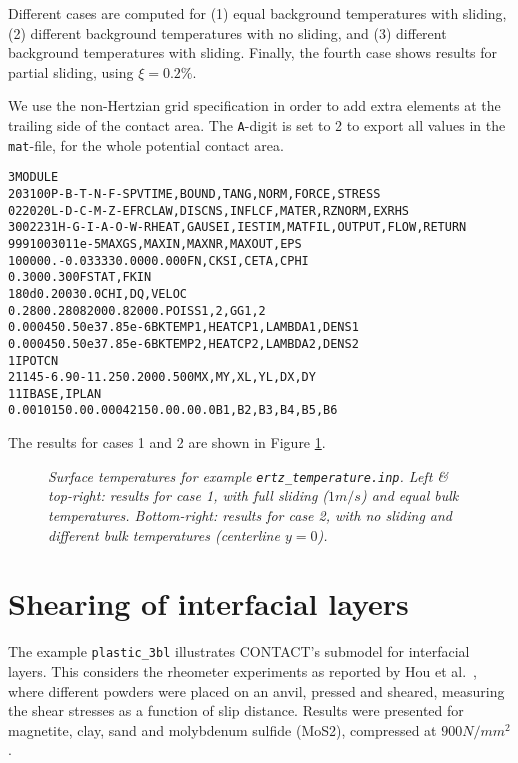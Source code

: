 \documentclass[12pt]{report}
\begin{document}
Different cases are computed for (1) equal background temperatures with
sliding, (2) different background temperatures with no sliding, and (3)
different background temperatures with sliding. Finally, the fourth case
shows results for partial sliding, using $\xi=0.2\%$.

We use the non-Hertzian grid specification in order to add extra elements
at the trailing side of the contact area. The {\tt A}-digit is set to 2 to
export all values in the {\tt mat}-file, for the whole potential contact
area. 
\begin{alltt}\small
 3  MODULE
  203100    P-B-T-N-F-S        PVTIME, BOUND , TANG  , NORM , FORCE, STRESS
  022020    L-D-C-M-Z-E        FRCLAW, DISCNS, INFLCF, MATER, RZNORM, EXRHS
 3002231  H-G-I-A-O-W-R  HEAT, GAUSEI, IESTIM, MATFIL, OUTPUT, FLOW, RETURN
   999   100    30      1     1e-5     MAXGS , MAXIN , MAXNR , MAXOUT, EPS
  100000.  -0.03333  0.000    0.000          FN, CKSI, CETA, CPHI
   0.300    0.300                            FSTAT, FKIN
   180d     0.200    30.0                    CHI, DQ, VELOC
   0.280    0.280    82000.   82000.         POISS 1,2,  GG 1,2
   0.000    450.     50e3     7.85e-6        BKTEMP1, HEATCP1, LAMBDA1,DENS1
   0.000    450.     50e3     7.85e-6        BKTEMP2, HEATCP2, LAMBDA2,DENS2
    1                                        IPOTCN
   211  45  -6.90  -11.25   0.200   0.500    MX,MY, XL,YL, DX,DY
    1    1                                   IBASE, IPLAN
  0.001015  0.0  0.0004215  0.0  0.0  0.0    B1,B2,B3,B4,B5,B6
\end{alltt}
The results for cases 1 and 2 are shown in Figure \ref{fig:temperature}.

\begin{figure}[bt]
\centering
{}
\caption{\em Surface temperatures for example {\tt ertz\_temperature.inp}.
Left \& top-right: results for case 1, with full sliding ($1\unit{m/s}$) and
equal bulk temperatures. Bottom-right: results for case 2, with no sliding
and different bulk temperatures (centerline $y=0$).}
\label{fig:temperature}
\end{figure}

\section{Shearing of interfacial layers}
\label{sec:ex_plastic}

The example {\tt plastic\_3bl} illustrates CONTACT's submodel for
interfacial layers. This considers the rheometer experiments as reported by
Hou et al.\ \cite{Hou1997}, where different powders were placed on an
anvil, pressed and sheared, measuring the shear stresses as a function of
slip distance. Results were presented for magnetite, clay, sand and
molybdenum sulfide (MoS2), compressed at $900\unit{N/mm^2}$.
\end{document}
